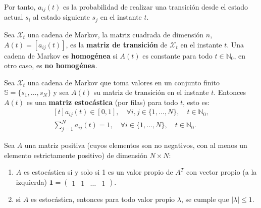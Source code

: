 Por tanto, $a_{ij}(t)$ es la probabilidad de realizar una transición desde el estado actual $s_i$ al estado siguiente $s_j$ en el instante $t$.

\begin{definition}
Sea $\mathcal{X}_t$ una cadena de Markov, la matriz cuadrada de dimensión $n$,  $A(t)=[a_{ij}(t)]$, es la \textbf{matriz de transición} de $\mathcal{X}_t$ en el instante $t$. Una cadena de Markov es \textbf{homogénea} si $A(t)$ es constante para todo $t\in\mathbb{N}_0$, en otro caso, es \textbf{no homogénea}. 
\end{definition}

\begin{definition}
Sea $\mathcal{X}_t$ una cadena de Markov que toma valores en un conjunto finito $\mathbb{S}=\{s_1,...,s_N\}$ y sea $A(t)$ su matriz de transición en el instante $t$. Entonces $A(t)$ es una \textbf{matriz estocástica} (por filas) para todo $t$, esto es:
\[
\begin{aligned}[t]
a_{ij}(t)\in[0,1],\quad \forall i,j \in \{1,...,N\},\quad t\in\mathbb{N}_0,\\
\sum_{j=1}^N a_{ij}(t)=1, \quad \forall i\in\{1,...,N\},\quad t\in\mathbb{N}_0.
\end{aligned}
\]
\end{definition}

\begin{proposition}\label{propiedadMatrizEstocástica}
    
Sea $A$ una matriz positiva (cuyos elementos son no negativos, con al menos un elemento estrictamente positivo) de dimensión $N\times N$:
\begin{enumerate}
    \item $A$ es estocástica si y solo si 1 es un valor propio de $A^T$ con vector propio (a la izquierda) $\mathbf{1}=\begin{pmatrix}1 & 1 & \dots & 1\end{pmatrix}$.
    \item si $A$ es estocástica, entonces para todo valor propio $\lambda$, se cumple que  $\left|\lambda\right|\leq1.$
\end{enumerate}
\end{proposition}

